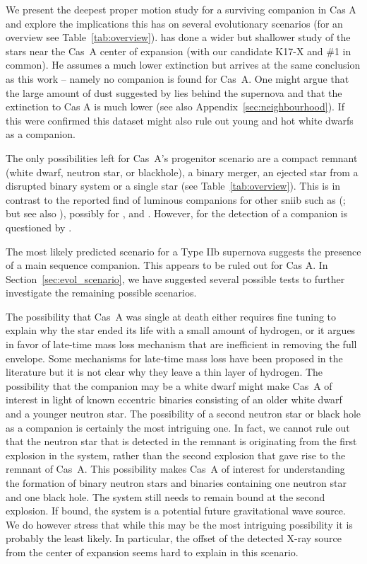 \documentclass{aa}
\begin{document}
We present the deepest proper motion study for a surviving companion in Cas A and explore the implications this has on several evolutionary scenarios (for an overview see Table~\ref{tab:overview}). \citet{2018MNRAS.473.1633K} has done a wider but shallower study of the stars near the Cas~A center of expansion (with our candidate K17-X and \#1 in common). He assumes a much lower extinction  \citep[$A_V\approx4$\,mag compared to our assumption of $A_V=10.6$\,mag as suggested by ][]{2017MNRAS.465.3309D} but arrives at the same conclusion as this work -- namely no companion is found for Cas~A. One might argue that the large amount of dust suggested by \citet{2017MNRAS.465.3309D} lies behind the supernova and that the extinction to Cas A is much lower (see also Appendix~\ref{sec:neighbourhood}). If this were confirmed this dataset might also rule out young and hot white dwarfs as a companion.

The only possibilities left for Cas~A's progenitor scenario are a compact remnant (white dwarf, neutron star, or blackhole), a binary merger, an ejected star from a disrupted binary system or a single star (see Table~\ref{tab:overview}). This is in contrast to the reported find of luminous companions for other \gls{sniib} such as  (\citealt{2004Natur.427..129M}; but see also \citet{2014ApJ...790...17F}), possibly for  \citep{2006MNRAS.369L..32R}, and  \citep{2014ApJ...793L..22F}. However, for  the detection of a companion is questioned by \citet{2015MNRAS.454.2580M}.

The most likely predicted scenario for a Type IIb supernova suggests the presence of a main sequence companion. This appears to be ruled out for Cas A. In Section~\ref{sec:evol_scenario}, we have suggested several possible tests to further investigate the remaining possible scenarios.

The possibility that Cas~A was single at death either requires fine tuning to explain why the star ended its life with a small amount of hydrogen, or it argues in favor of late-time mass loss mechanism that are inefficient in removing the full envelope. Some mechanisms for late-time mass loss have been proposed in the literature but it is not clear why they leave a thin layer of hydrogen.
%
The possibility that the companion may be a white dwarf might make Cas~A of interest in light of known eccentric binaries consisting of an older white dwarf and a younger neutron star.
%
The possibility of a second neutron star or black hole as a companion is certainly the most intriguing one. In fact, we cannot rule out that the neutron star that is detected in the remnant is originating from the first explosion in the system, rather than the second explosion that gave rise to the remnant of Cas~A. This possibility makes Cas~A of interest for understanding the formation of binary neutron stars and binaries containing one neutron star and one black hole. The system still needs to remain bound at the second explosion. If bound, the system is a potential future gravitational wave source. We do however stress that while this may be the most intriguing possibility it is probably the least likely. In particular, the offset of the detected X-ray source from the center of expansion seems hard to explain in this scenario.
\end{document}
